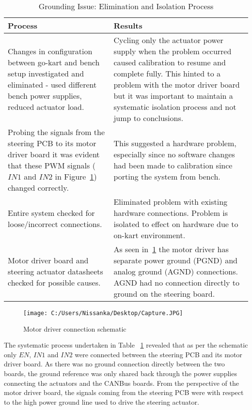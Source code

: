 \documentclass{ENZCon}
\begin{document}
\begin{table}[tbp]
	\centering
		\begin{tabular}{|p{}|p{}|}
		\hline
		\textbf{Process} & \textbf{Results}\\
		\hline
		Changes in configuration between go-kart and bench setup investigated and eliminated - used different bench power supplies, reduced actuator load. & Cycling only the actuator power supply when the problem occurred caused calibration to resume and complete fully. This hinted to a problem with the motor driver board but it was important to maintain a systematic isolation process and not jump to conclusions.\\
		\hline
		Probing the signals from the steering PCB to its motor driver board it was evident that these PWM signals ($IN1$ and $IN2$ in Figure~\ref{fig:Sch}) changed correctly. & This suggested a hardware problem, especially since no software changes had been made to calibration since porting the system from bench.\\
		\hline
		Entire system checked for loose/incorrect connections. & Eliminated problem with existing hardware connections. Problem is isolated to effect on hardware due to on-kart environment.\\
		\hline
		Motor driver board and steering actuator datasheets checked for possible causes. & As seen in~\ref{fig:Sch} the motor driver has separate power ground (PGND) and analog ground (AGND) connections. AGND had no connection directly to ground on the steering board.\\
		\hline			
		\end{tabular}
	\caption{Grounding Issue: Elimination and Isolation Process}
	\label{tab:grounding}
\end{table}

\begin{figure}[h!]
	\centering
		\texttt{[image: C:/Users/Nissanka/Desktop/Capture.JPG]}
	\caption{Motor driver connection schematic}
	\label{fig:Sch}
\end{figure}


The systematic process undertaken in Table ~\ref{tab:grounding} revealed that as per the schematic only $EN$, $IN1$ and $IN2$ were connected between the steering PCB and its motor driver board. As there was no ground connection directly between the two boards, the ground reference was only shared back through the power supplies connecting the actuators and the CANBus boards. From the perspective of the motor driver board, the signals coming from the steering PCB were with respect to the high power ground line used to drive the steering actuator.
\end{document}
